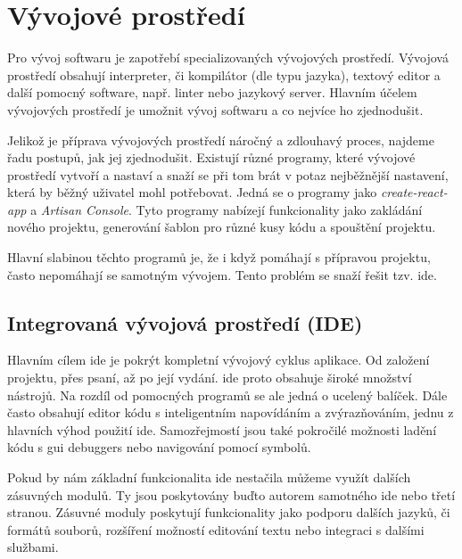 \section{Vývojové prostředí}
\label{sub:development-enviroment}

Pro vývoj softwaru je zapotřebí specializovaných vývojových prostředí. Vývojová prostředí obsahují interpreter, či kompilátor (dle typu jazyka)\cite{interpreter-vs-compiler}, textový editor a další pomocný software, např. linter\cite{linter} nebo jazykový server\cite{language-server}. Hlavním účelem vývojových prostředí je umožnit vývoj softwaru a co nejvíce ho zjednodušit. 

Jelikož je příprava vývojových prostředí náročný a zdlouhavý proces, najdeme řadu postupů, jak jej zjednodušit. Existují různé programy, které vývojové prostředí vytvoří a nastaví a snaží se při tom brát v potaz nejběžnější nastavení, která by běžný uživatel mohl potřebovat. Jedná se o programy jako \emph{create-react-app}\cite{create-react-app} a \emph{Artisan Console}\cite{laravel-artisan}. Tyto programy nabízejí funkcionality jako zakládání nového projektu, generování šablon pro různé kusy kódu a spouštění projektu.

Hlavní slabinou těchto programů je, že i když pomáhají s přípravou projektu, často nepomáhají se samotným vývojem. Tento problém se snaží řešit tzv. \acrfull{ide}\cite{ide}.  

\subsection{Integrovaná vývojová prostředí (IDE)}

Hlavním cílem \acrshort{ide} je pokrýt kompletní vývojový cyklus aplikace. Od založení projektu, přes psaní, až po její vydání. \acrshort{ide} proto obsahuje široké množství nástrojů. Na rozdíl od pomocných programů se ale jedná o ucelený balíček. Dále často obsahují editor kódu s inteligentním napovídáním a zvýrazňováním, jednu z hlavních výhod použití \acrshort{ide}. Samozřejmostí jsou také pokročilé možnosti ladění kódu s \acrshort{gui} \glspl{debugger} nebo navigování pomocí symbolů.

Pokud by nám základní funkcionalita \acrshort{ide} nestačila můžeme využít dalších zásuvných modulů. Ty jsou poskytovány buďto autorem samotného \acrshort{ide} nebo třetí stranou. Zásuvné moduly poskytují funkcionality jako podporu dalších jazyků, či formátů souborů, rozšíření možností editování textu nebo integraci s dalšími službami.